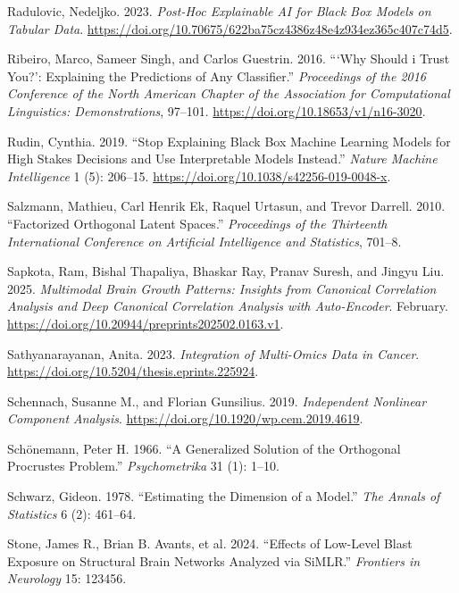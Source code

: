 \documentclass[
  letterpaper,
]{report}
\newlength{\cslhangindent}
\newenvironment{CSLReferences}[2] %
 {\begin{list}{}{%
  \setlength{\itemindent}{0pt}
  \setlength{\leftmargin}{0pt}
  \setlength{\parsep}{0pt}
  \ifodd #1
   \setlength{\leftmargin}{\cslhangindent}
   \setlength{\itemindent}{-1\cslhangindent}
  \fi
  \setlength{\itemsep}{#2\baselineskip}}}
 {\end{list}}
\begin{document}
\begin{CSLReferences}{1}{1}
Radulovic, Nedeljko. 2023. \emph{Post-Hoc Explainable AI for Black Box
Models on Tabular Data}.
\url{https://doi.org/10.70675/622ba75cz4386z48e4z934ez365c407c74d5}.

Ribeiro, Marco, Sameer Singh, and Carlos Guestrin. 2016. {``{`Why Should
i Trust You?'}: Explaining the Predictions of Any Classifier.''}
\emph{Proceedings of the 2016 Conference of the North American Chapter
of the Association for Computational Linguistics: Demonstrations},
97--101. \url{https://doi.org/10.18653/v1/n16-3020}.

Rudin, Cynthia. 2019. {``Stop Explaining Black Box Machine Learning
Models for High Stakes Decisions and Use Interpretable Models
Instead.''} \emph{Nature Machine Intelligence} 1 (5): 206--15.
\url{https://doi.org/10.1038/s42256-019-0048-x}.

Salzmann, Mathieu, Carl Henrik Ek, Raquel Urtasun, and Trevor Darrell.
2010. {``Factorized Orthogonal Latent Spaces.''} \emph{Proceedings of
the Thirteenth International Conference on Artificial Intelligence and
Statistics}, 701--8.

Sapkota, Ram, Bishal Thapaliya, Bhaskar Ray, Pranav Suresh, and Jingyu
Liu. 2025. \emph{Multimodal Brain Growth Patterns: Insights from
Canonical Correlation Analysis and Deep Canonical Correlation Analysis
with Auto-Encoder}. February.
\url{https://doi.org/10.20944/preprints202502.0163.v1}.

Sathyanarayanan, Anita. 2023. \emph{Integration of Multi-Omics Data in
Cancer}. \url{https://doi.org/10.5204/thesis.eprints.225924}.

Schennach, Susanne M., and Florian Gunsilius. 2019. \emph{Independent
Nonlinear Component Analysis}.
\url{https://doi.org/10.1920/wp.cem.2019.4619}.

Schönemann, Peter H. 1966. {``A Generalized Solution of the Orthogonal
Procrustes Problem.''} \emph{Psychometrika} 31 (1): 1--10.

Schwarz, Gideon. 1978. {``Estimating the Dimension of a Model.''}
\emph{The Annals of Statistics} 6 (2): 461--64.

{Stone, James R., Brian B. Avants, et al.} 2024. {``Effects of Low-Level
Blast Exposure on Structural Brain Networks Analyzed via SiMLR.''}
\emph{Frontiers in Neurology} 15: 123456.


\end{CSLReferences}
\end{document}

